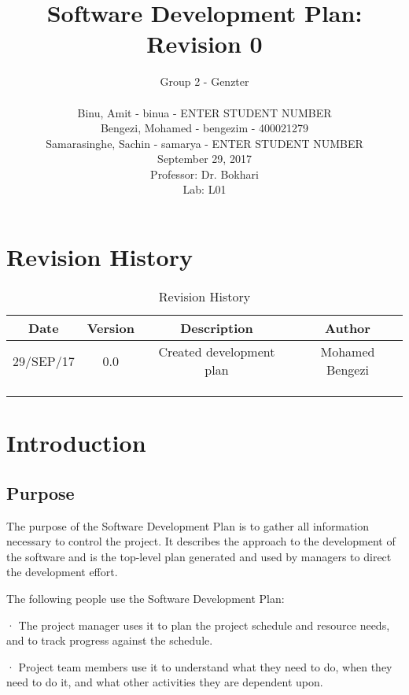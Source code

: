\documentclass[12pt]{article}
\title{Software Development Plan: Revision 0}
\author{Group 2 - Genzter \\
		\\ Binu, Amit - binua - ENTER STUDENT NUMBER
		\\ Bengezi, Mohamed - bengezim - 400021279
		\\ Samarasinghe, Sachin - samarya - ENTER STUDENT NUMBER
		\\ September 29, 2017
		\\Professor: Dr. Bokhari
		\\ Lab: L01}
\begin{document}
\maketitle

\newpage

{\centering
  \tableofcontents\par
}

\newpage
\section{Revision History}
\begin{table}[h]
\begin{center}
\begin{tabular}{ | c | c | c | c | }
\hline
 Date & Version & Description & Author \\ 
\hline
 29/SEP/17 & 0.0 & Created development plan & Mohamed Bengezi \\  
\hline
  & & & \\
\hline
 & & & \\
\hline 
 & & & \\ 
\hline 
\end{tabular}
\end{center}
\caption{Revision History}
\end{table}

\newpage
\section{Introduction}
\subsection{Purpose}
The purpose of the Software Development Plan is to gather all information necessary to control the project. It describes the approach to the development of the software and is the top-level plan generated and used by managers to direct the development effort.

The following people use the Software Development Plan:

·         The project manager uses it to plan the project schedule and resource needs, and to track progress against the schedule.

·         Project team members use it to understand what they need to do, when they need to do it, and what other activities they are dependent upon.

\newpage
\end{document}
